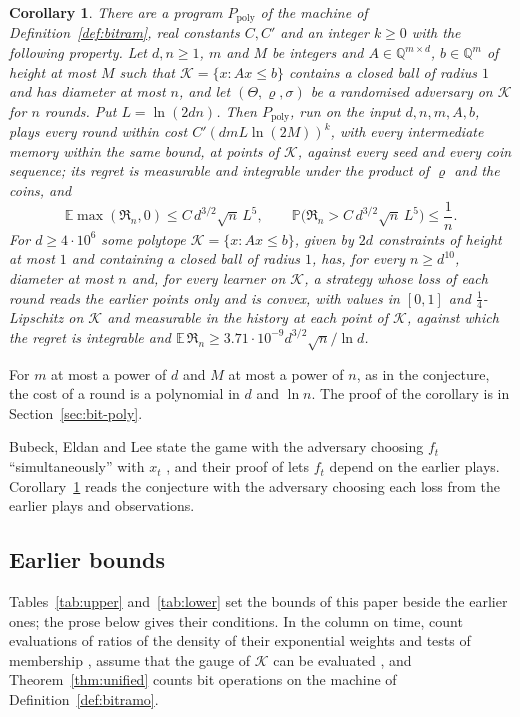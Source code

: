 \documentclass[11pt]{amsart}
\newtheorem{corollary}[theorem]{Corollary}
\theoremstyle{definition}
\numberwithin{equation}{section}
\newcommand{\E}{\mathbb{E}}
\newcommand{\Prob}{\mathbb{P}}
\newcommand{\cK}{\mathcal{K}}
\newcommand{\Reg}{\mathfrak{R}}
\begin{document}
\begin{corollary}\label{cor:conj1}
There are a program $P_{\mathrm{poly}}$ of the machine of Definition~\ref{def:bitram}, real constants $C,C'$ and an integer $k\ge0$ with the following property. Let $d,n\ge1$, $m$ and $M$ be integers and $A\in\mathbb Q^{m\times d}$, $b\in\mathbb Q^m$ of height at most $M$ such that $\cK=\{x:Ax\le b\}$ contains a closed ball of radius $1$ and has diameter at most $n$, and let $(\Theta,\varrho,\sigma)$ be a randomised adversary on $\cK$ for $n$ rounds. Put $L=\ln(2dn)$. Then $P_{\mathrm{poly}}$, run on the input $d,n,m,A,b$, plays every round within cost $C'(dmL\ln(2M))^k$, with every intermediate memory within the same bound, at points of $\cK$, against every seed and every coin sequence; its regret is measurable and integrable under the product of $\varrho$ and the coins, and
\[
\E\max(\Reg_n,0)\le C\,d^{3/2}\sqrt n\,L^5,\qquad\Prob\bigl(\Reg_n>C\,d^{3/2}\sqrt n\,L^5\bigr)\le\frac1n .
\]
For $d\ge4\cdot10^6$ some polytope $\cK=\{x:Ax\le b\}$, given by $2d$ constraints of height at most $1$ and containing a closed ball of radius $1$, has, for every $n\ge d^{10}$, diameter at most $n$ and, for every learner on $\cK$, a strategy whose loss of each round reads the earlier points only and is convex, with values in $[0,1]$ and $\frac14$-Lipschitz on $\cK$ and measurable in the history at each point of $\cK$, against which the regret is integrable and $\E\,\Reg_n\ge3.71\cdot10^{-9}d^{3/2}\sqrt n/\ln d$.
\end{corollary}

For $m$ at most a power of $d$ and $M$ at most a power of $n$, as in the conjecture, the cost of a round is a polynomial in $d$ and $\ln n$. The proof of the corollary is in Section~\ref{sec:bit-poly}.

Bubeck, Eldan and Lee state the game with the adversary choosing $f_t$ ``simultaneously'' with $x_t$ \cite[Section~1.1]{BEL21}, and their proof of \cite[Theorem~1]{BEL21} lets $f_t$ depend on the earlier plays. Corollary~\ref{cor:conj1} reads the conjecture with the adversary choosing each loss from the earlier plays and observations.

\subsection{Earlier bounds}\label{sec:intro-earlier}

Tables~\ref{tab:upper} and~\ref{tab:lower} set the bounds of this paper beside the earlier ones; the prose below gives their conditions. In the column on time, \cite{BEL21} count evaluations of ratios of the density of their exponential weights and tests of membership \cite[Section~6.1]{BEL21}, \cite{BJLR26} assume that the gauge of $\cK$ can be evaluated \cite[Section~4]{BJLR26}, and Theorem~\ref{thm:unified} counts bit operations on the machine of Definition~\ref{def:bitramo}.
\end{document}
